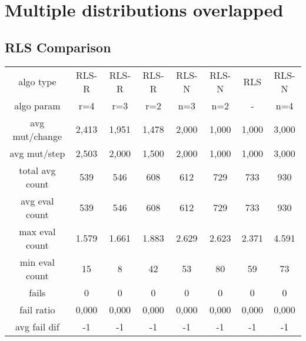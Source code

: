 \section{Multiple distributions overlapped}

\subsection{RLS Comparison}

\begin{tabular}[h]{cccccccc}
algo type&           RLS-R&    RLS-R&    RLS-R&    RLS-N&    RLS-N&      RLS&    RLS-N\\
algo param&            r=4&      r=3&      r=2&      n=3&      n=2&        -&      n=4\\
avg mut/change&      2,413&    1,951&    1,478&    2,000&    1,000&    1,000&    3,000\\
avg mut/step&        2,503&    2,000&    1,500&    2,000&    1,000&    1,000&    3,000\\
\hline
total avg count&       539&      546&      608&      612&      729&      733&      930\\
avg eval count&        539&      546&      608&      612&      729&      733&      930\\
max eval count&      1.579&    1.661&    1.883&    2.629&    2.623&    2.371&    4.591\\
min eval count&         15&        8&       42&       53&       80&       59&       73\\
\hline
fails&                   0&        0&        0&        0&        0&        0&        0\\
fail ratio&          0,000&    0,000&    0,000&    0,000&    0,000&    0,000&    0,000\\
avg fail dif&           -1&       -1&       -1&       -1&       -1&       -1&       -1\\
\end{tabular}

